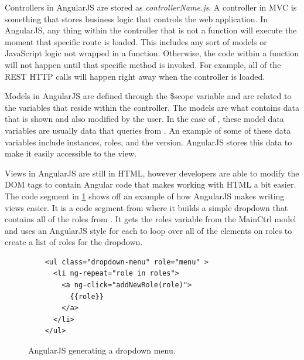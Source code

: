 Controllers in AngularJS are stored as \emph{controllerName.js}. A controller in MVC is something that stores business logic that controls the web application. In AngularJS, any thing within the controller that is not a function will execute the moment that specific route is loaded. This includes any sort of models or JavaScript logic not wrapped in a function. Otherwise, the code within a function will not happen until that specific method is invoked. For example, all of the REST HTTP calls will happen right away when the controller is loaded.

Models in AngularJS are defined through the \$scope variable and are related to the variables that reside within the controller. The models are what contains data that is shown and also modified by the user. In the case of \projectName{}, these model data variables are usually data that \projectName{} queries from \ancor{}. An example of some of these data variables include instances, roles, and the \ancor{} version. AngularJS stores this data to make it easily accessible to the view.

Views in AngularJS are still in HTML, however developers are able to modify the DOM tags to contain Angular code that makes working with HTML a bit easier. The code segment in \ref{htmlcodefigure1} shows off an example of how AngularJS makes writing views easier. It is a code segment from \projectName{} where it builds a simple dropdown that contains all of the roles from \ancor{}. It gets the roles variable from the MainCtrl model and uses an AngularJS style for each to loop over all of the elements on roles to create a list of roles for the dropdown.

\begin{figure}[H]
  \begin{center}
    \renewcommand{\theFancyVerbLine}{
      \sffamily\textcolor[rgb]{0.5,0.5,0.5}{\scriptsize\arabic{FancyVerbLine}}}
    \begin{verbatim}
    <ul class="dropdown-menu" role="menu" >
      <li ng-repeat="role in roles">
        <a ng-click="addNewRole(role)">
          {{role}}
        </a>
      </li>
    </ul>
    \end{verbatim}

  \end{center}
  \caption{AngularJS generating a dropdown menu.}
  \label{htmlcodefigure1}
\end{figure}

